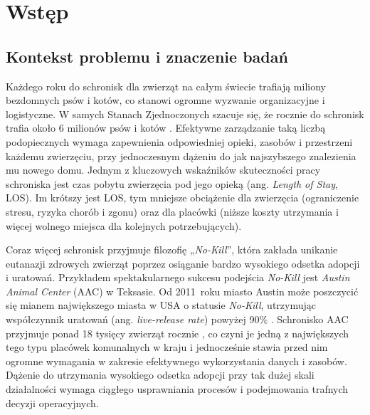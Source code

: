 \chapter{Wstęp}\label{chap:wstep}

\section{Kontekst problemu i znaczenie badań}\label{sec:kontekst-problemu}

Każdego roku do schronisk dla zwierząt na całym świecie trafiają miliony bezdomnych psów i kotów, co stanowi ogromne wyzwanie organizacyjne i logistyczne. W samych Stanach Zjednoczonych szacuje się, że rocznie do schronisk trafia około 6 milionów psów i kotów \cite{SAC2024,aspca2024}. Efektywne zarządzanie taką liczbą podopiecznych wymaga zapewnienia odpowiedniej opieki, zasobów i przestrzeni każdemu zwierzęciu, przy jednoczesnym dążeniu do jak najszybszego znalezienia mu nowego domu. Jednym z kluczowych wskaźników skuteczności pracy schroniska jest czas pobytu zwierzęcia pod jego opieką (ang. \emph{Length of Stay}, LOS). Im krótszy jest LOS, tym mniejsze obciążenie dla zwierzęcia (ograniczenie stresu, ryzyka chorób i zgonu) oraz dla placówki (niższe koszty utrzymania i więcej wolnego miejsca dla kolejnych potrzebujących).

Coraz więcej schronisk przyjmuje filozofię „\emph{No-Kill}”, która zakłada unikanie eutanazji zdrowych zwierząt poprzez osiąganie bardzo wysokiego odsetka adopcji i uratowań. Przykładem spektakularnego sukcesu podejścia \emph{No-Kill} jest \emph{Austin Animal Center} (AAC) w Teksasie. Od 2011~roku miasto Austin może poszczycić się mianem największego miasta w USA o statusie \emph{No-Kill}, utrzymując współczynnik uratowań (ang. \emph{live-release rate}) powyżej 90\% \cite{Austin2010}. Schronisko AAC przyjmuje ponad 18 tysięcy zwierząt rocznie \cite{Austin2010}, co czyni je jedną z największych tego typu placówek komunalnych w kraju i jednocześnie stawia przed nim ogromne wymagania w zakresie efektywnego wykorzystania danych i zasobów. Dążenie do utrzymania wysokiego odsetka adopcji przy tak dużej skali działalności wymaga ciągłego usprawniania procesów i podejmowania trafnych decyzji operacyjnych.

